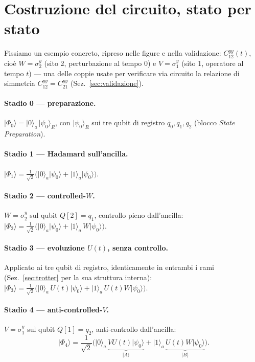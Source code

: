 \documentclass[11pt,a4paper]{article}
\newcommand{\ket}[1]{\lvert #1\rangle}
\begin{document}
\section{Costruzione del circuito, stato per stato}

Fissiamo un esempio concreto, ripreso nelle figure e nella validazione:
$C_{12}^{yy}(t)$, cioè $W=\sigma_2^y$ (sito 2, perturbazione al tempo $0$) e $V=\sigma_1^y$ (sito
1, operatore al tempo $t$) --- una delle coppie usate per verificare via circuito la relazione di
simmetria $C_{12}^{yy}=C_{21}^{yy}$ (Sez.~\ref{sec:validazione}).

\paragraph{Stadio 0 --- preparazione.} $\ket{\Phi_0}=\ket0_a\,\ket{\psi_0}_R$, con
$\ket{\psi_0}_R$ sui tre qubit di registro $q_0,q_1,q_2$ (blocco \emph{State Preparation}).

\paragraph{Stadio 1 --- Hadamard sull'ancilla.}
$\ket{\Phi_1}=\tfrac{1}{\sqrt2}\big(\ket0_a\ket{\psi_0}+\ket1_a\ket{\psi_0}\big)$.

\paragraph{Stadio 2 --- controlled-$W$.} $W=\sigma_2^y$ sul qubit $Q[2]=q_1$, controllo pieno
dall'ancilla:
$\ket{\Phi_2}=\tfrac{1}{\sqrt2}\big(\ket0_a\ket{\psi_0}+\ket1_a\,W\ket{\psi_0}\big)$.

\paragraph{Stadio 3 --- evoluzione $U(t)$, senza controllo.} Applicato ai tre qubit di registro,
identicamente in entrambi i rami (Sez.~\ref{sec:trotter} per la sua struttura interna):
$\ket{\Phi_3}=\tfrac{1}{\sqrt2}\big(\ket0_a\,U(t)\ket{\psi_0}+\ket1_a\,U(t)W\ket{\psi_0}\big)$.

\paragraph{Stadio 4 --- anti-controlled-$V$.} $V=\sigma_1^y$ sul qubit $Q[1]=q_2$,
anti-controllo dall'ancilla:
\begin{equation}
\boxed{\;\ket{\Phi_4}=\frac{1}{\sqrt2}\Big(\ket0_a\,\underbrace{VU(t)\ket{\psi_0}}_{\ket A}
+\ket1_a\,\underbrace{U(t)W\ket{\psi_0}}_{\ket B}\Big).}
\label{eq:phi4}
\end{equation}
\end{document}
